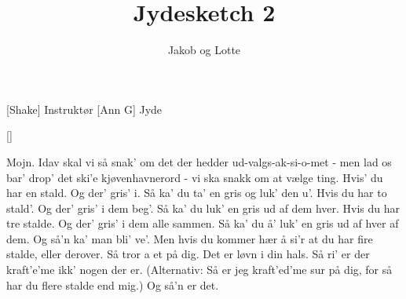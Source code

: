 \documentclass[a4paper,11pt]{article}
\title{Jydesketch 2}
\author{Jakob og Lotte}
\begin{document}
\maketitle

\begin{roles}
[Shake] Instruktør
[Ann G] Jyde
\end{roles}

\begin{props}
[]
\end{props}

\begin{sketch}

 Mojn. Idav skal vi så snak’ om det der hedder ud-valgs-ak-si-o-met - men lad os bar’ drop’ det ski’e kjøvenhavnerord -  vi ska snakk om at vælge ting. Hvis’ du har en stald. Og der’ gris’ i. Så ka’ du ta’ en gris og luk’ den u’. Hvis du har to stald'. Og der’ gris’ i dem beg’. Så ka’ du luk’ en gris ud af dem hver. Hvis du har tre stalde. Og der’ gris’ i dem alle sammen. Så ka’ du å’ luk’ en gris ud af hver af dem. Og så’n ka’ man bli’ ve'. Men hvis du kommer hær å si'r at du har fire stalde, eller derover. Så tror a et på dig. Det er løvn i din hals. Så ri’ er der kraft'e'me ikk’ nogen der er. (Alternativ: Så er jeg kraft’ed’me sur på dig, for så har du flere stalde end mig.) Og så’n er det.
\end{sketch}
\end{document}
